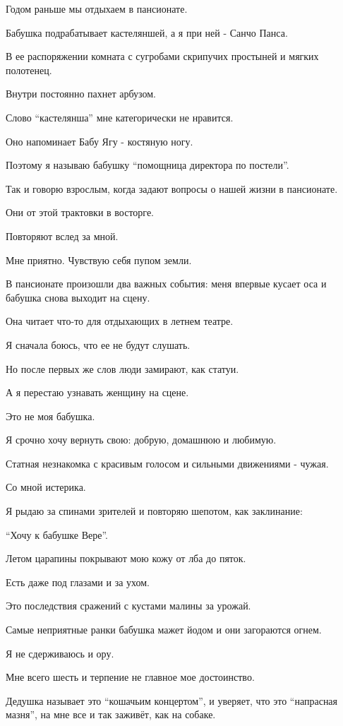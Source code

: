 Годом раньше мы   отдыхаем  в пансионате.

Бабушка подрабатывает  кастеляншей, а я  при ней -  Санчо Панса. 

В ее распоряжении комната с  сугробами  скрипучих   простыней и мягких
полотенец. 

Внутри постоянно  пахнет арбузом.  

Слово \enquote{кастелянша} мне категорически не нравится. 

Оно напоминает  Бабу Ягу - костяную ногу.  

Поэтому я называю  бабушку \enquote{помощница  директора по постели}.  

Так и говорю взрослым, когда задают вопросы о нашей  жизни в пансионате. 

Они  от этой трактовки в восторге.

Повторяют вслед за мной. 

Мне приятно. Чувствую себя пупом земли. 

В пансионате произошли два важных события: меня впервые кусает оса и бабушка
снова выходит на сцену. 

Она читает что-то для отдыхающих в летнем театре. 

Я сначала боюсь, что ее не будут слушать. 

Но после первых же слов люди замирают, как статуи. 

А я  перестаю узнавать женщину на сцене.

Это  не моя бабушка. 

Я срочно хочу вернуть свою: добрую, домашнюю и любимую.

Статная незнакомка с красивым голосом и сильными движениями - чужая. 

Со мной истерика.

Я рыдаю за спинами зрителей и повторяю шепотом, как заклинание: 

\enquote{Хочу к бабушке Вере}. 

Летом  царапины покрывают мою кожу  от лба до пяток. 

Есть даже под глазами и за ухом. 

Это последствия сражений с кустами малины за урожай.

Самые неприятные ранки бабушка мажет йодом и  они  загораются огнем. 

Я не сдерживаюсь и ору. 

Мне всего шесть и терпение не главное мое достоинство.

Дедушка называет это \enquote{кошачьим концертом}, и уверяет, что это \enquote{напрасная
мазня},  на мне все и так  заживёт, как на собаке.

